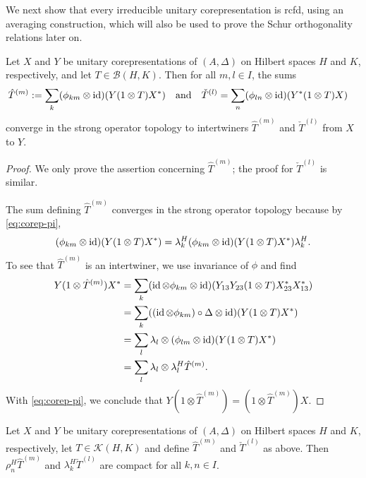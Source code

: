 We next show that every irreducible unitary corepresentation
is rcfd, using an averaging construction, which
will also be used to prove the Schur orthogonality relations later on.
\begin{Lem} \label{lem:intertwiner-averaged}
  Let $X$ and $Y$ be unitary corepresentations of $(A,\Delta)$ on Hilbert spaces $H$ and $K$,
  respectively, and let $T \in \mathcal{B}(H,K)$. Then for all $m,l \in I$, the sums
  \begin{align*}
    \hat T^{(m)} &:= \sum_{k} (\phi_{km} \otimes \operatorname{id})(Y(1 \otimes T)X^{*}) \quad \text{and} \quad
    \check T^{(l)}=\sum_{n} (\phi_{ln}\otimes \operatorname{id})(Y^{*}(1 \otimes T)X)
  \end{align*}
  converge in the strong operator topology to intertwiners $\hat
  T^{(m)}$ and $\check T^{(l)}$ from $X$ to $Y$.
\end{Lem}
\begin{proof}
  We only prove the assertion concerning $\hat T^{(m)}$; the proof for $\check T^{(l)}$ is similar.
  
  The sum defining $\hat T^{(m)}$ converges in the strong operator topology because by
  \eqref{eq:corep-pi},
  \begin{align*}
    (\phi_{km} \otimes \operatorname{id})(Y(1 \otimes T)X^{*}) = \lambda^{H}_{k}
    (\phi_{km} \otimes \operatorname{id})(Y(1 \otimes T)X^{*}) \lambda^{H}_{k}.
  \end{align*}
  To see that $\hat T^{(m)}$ is an intertwiner, we use invariance of $\phi$ and find
  \begin{align*}
    Y(1 \otimes \hat T^{(m)})X^{*} &=
    \sum_{k} (\operatorname{id} \otimes \phi_{km} \otimes \operatorname{id})(Y_{13}Y_{23}(1 \otimes T)X^{*}_{23}X^{*}_{13}) \\
    &= \sum_{k} ((\operatorname{id} \otimes \phi_{km})\circ \Delta \otimes \operatorname{id})(Y(1 \otimes T)X^{*}) \\
    &=\sum_{l} \lambda_{l} \otimes (\phi_{lm} \otimes \operatorname{id})(Y(1\otimes T)X^{*}) \\
    &= \sum_{l} \lambda_{l}   \otimes \lambda^{H}_{l} \hat T^{(m)}.
  \end{align*}%
  With \eqref{eq:corep-pi}, we conclude that $Y(1\otimes \hat T^{(m)})
  = (1 \otimes \hat T^{(m)})X$.
\end{proof} 
\begin{Lem} \label{lem:intertwiner-compact} Let $X$ and $Y$ be unitary corepresentations of
  $(A,\Delta)$ on Hilbert spaces $H$ and $K$, respectively, let $T \in \mathcal{K}(H,K)$ and define
  $\hat T^{(m)}$ and $\check T^{(l)}$ as above. Then $\rho^{H}_{n}\hat T^{(m)}$ and
  $\lambda^{H}_{k}\check T^{(l)}$ are compact for all $k,n\in I$.
\end{Lem}
